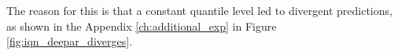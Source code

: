 \documentclass[a4paper,oneside,bibliography=totoc]{scrbook}
\begin{document}
The reason for this is that a constant quantile level led to divergent predictions, as shown in the Appendix \ref{ch:additional_exp} in Figure \ref{fig:iqn_deepar_diverges}.

\end{document}
